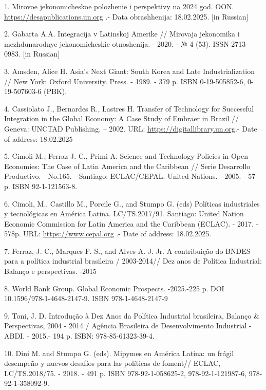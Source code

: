 \begin{references}
1. Mirovoe jekonomicheskoe polozhenie i perspektivy na 2024 god. OON.
\href{https://desapublications.un.org/sites/default/files/publications/2024-03/WESP\%202024_Executive\%20Summary_Russian_0.pdf}{https://desapublications.un.org}
.- Data obrashhenija:
18.02.2025. {[}in Russian{]}

2. Gabarta A.A. Integracija v Latinskoj Amerike // Mirovaja jekonomika i
mezhdunarodnye jekonomicheskie otnoshenija. - 2020. - № 4 (53). ISSN
2713-0983. {[}in Russian{]}

3. Amsden, Alice H. Asia's Next Giant: South Korea and Late
Industrialization // New York: Oxford University. Press. - 1989. - 379
p. ISBN 0-19-505852-6, 0-19-507603-6 (PBK).

4. Cassiolato J., Bernardes R., Lastres H. Transfer of Technology for
Successful Integration in the Global Economy: A Case Study of Embraer in
Brazil // Geneva: UNCTAD Publishing. -- 2002. URL:
\href{https://digitallibrary.un.org/record/479842?v=pdf}{https://digitallibrary.un.org}.- Date of
address: 18.02.2025

5. Cimoli M., Ferraz J. C., Primi A. Science and Technology Policies in
Open Economies: The Case of Latin America and the Caribbean // Serie
Desarrollo Productivo. - No.165. - Santiago: ECLAC/CEPAL. United
Nations. - 2005. - 57 p. ISBN 92-1-121563-8.

6. Cimoli, M., Castillo M., Porcile G., and Stumpo G. (eds) Políticas
industriales y tecnológicas en América Latina. LC/TS.2017/91. Santiago:
United Nation Economic Commission for Latin America and the Caribbean
(ECLAC). - 2017. - 578p. URL:
\href{https://www.cepal.org/es/publicaciones/42363-politicasindustriales-tecnologicas-america-latina}{https://www.cepal.org} .-
Date of address: 18.02.2025.

7. Ferraz, J. C., Marques F. S., and Alves A. J. Jr. A contribuição do
BNDES para a política industrial brasileira / 2003-2014// Dez anos de
Política Industrial: Balanço e perspectivas. -2015

8. World Bank Group. Global Economic Prospects. -2025.-225 p. DOI
10.1596/978-1-4648-2147-9. ISBN 978-1-4648-2147-9

9. Toni, J. D. Introdução à Dez Anos da Política Industrial brasileira,
Balanço \& Perspectivas, 2004 - 2014 / Agência Brasileira de
Desenvolvimento Industrial - ABDI. - 2015.- 194 p. ISBN:
978-85-61323-39-4.

10. Dini M. and Stumpo G. (eds). Mipymes en América Latina: un frágil
desempeño y nuevos desafíos para las políticas de foment// ECLAC,
LC/TS.2018/75. - 2018. - 491 p. ISBN 978-92-1-058625-2,
978-92-1-121987-6, 978-92-1-358092-9.


\end{references}
